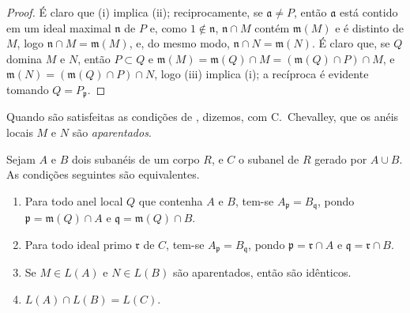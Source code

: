 \documentclass[oneside]{amsart}
\let\EGAOriginalLabel\label
\renewcommand{\label}[1]{\phantomsection\EGAOriginalLabel{#1}}
\begin{document}
\begin{proof}
É claro que (i) implica (ii);
reciprocamente, se $\mathfrak{a}\neq P$, então $\mathfrak{a}$ está contido em um ideal maximal $\mathfrak{n}$ de $P$ e, como $1\not\in\mathfrak{n}$, $\mathfrak{n}\cap M$ contém $\mathfrak{m}(M)$ e é distinto de $M$, logo $\mathfrak{n}\cap M=\mathfrak{m}(M)$, e, do mesmo modo, $\mathfrak{n}\cap N=\mathfrak{m}(N)$.
É claro que, se $Q$ domina $M$ e $N$, então $P\subset Q$ e $\mathfrak{m}(M)=\mathfrak{m}(Q)\cap M=(\mathfrak{m}(Q)\cap P)\cap M$, e $\mathfrak{m}(N)=(\mathfrak{m}(Q)\cap P)\cap N$, logo (iii) implica (i);
a recíproca é evidente tomando $Q=P_\mathfrak{p}$.
\end{proof}

Quando são satisfeitas as condições de , dizemos, com C.~Chevalley, que os anéis locais $M$ e $N$ são \emph{aparentados}.

\begin{proposition}[8.1.5]
\label{I.8.1.5}
Sejam $A$ e $B$ dois subanéis de um corpo $R$, e $C$ o subanel de $R$ gerado por $A\cup B$.
As condições seguintes são equivalentes.
\begin{enumerate}
  \item[{\rm(i)}] Para todo anel local $Q$ que contenha $A$ e $B$, tem-se $A_\mathfrak{p}=B_\mathfrak{q}$, pondo $\mathfrak{p}=\mathfrak{m}(Q)\cap A$ e $\mathfrak{q}=\mathfrak{m}(Q)\cap B$.
  \item[{\rm(ii)}] Para todo ideal primo $\mathfrak{r}$ de $C$, tem-se $A_\mathfrak{p}=B_\mathfrak{q}$, pondo $\mathfrak{p}=\mathfrak{r}\cap A$ e $\mathfrak{q}=\mathfrak{r}\cap B$.
  \item[{\rm(iii)}] Se $M\in L(A)$ e $N\in L(B)$ são aparentados, então são idênticos.
  \item[{\rm(iv)}] $L(A)\cap L(B)=L(C)$.
\end{enumerate}
\end{proposition}
\end{document}
